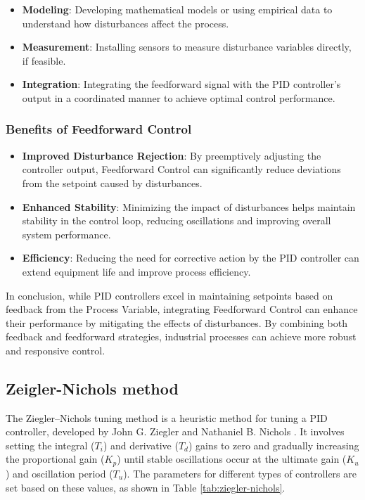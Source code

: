 \begin{itemize}
    \item \textbf{Modeling}: Developing mathematical models or using empirical data to understand how disturbances affect the process.

    \item \textbf{Measurement}: Installing sensors to measure disturbance variables directly, if feasible.

    \item \textbf{Integration}: Integrating the feedforward signal with the PID controller's output in a coordinated manner to achieve optimal control performance.
\end{itemize}

\subsubsection{Benefits of Feedforward Control}

\begin{itemize}
    \item \textbf{Improved Disturbance Rejection}: By preemptively adjusting the controller output, Feedforward Control can significantly reduce deviations from the setpoint caused by disturbances.

    \item \textbf{Enhanced Stability}: Minimizing the impact of disturbances helps maintain stability in the control loop, reducing oscillations and improving overall system performance.

    \item \textbf{Efficiency}: Reducing the need for corrective action by the PID controller can extend equipment life and improve process efficiency.
\end{itemize}

In conclusion, while PID controllers excel in maintaining setpoints based on
feedback from the Process Variable, integrating Feedforward Control can enhance
their performance by mitigating the effects of disturbances. By combining both
feedback and feedforward strategies, industrial processes can achieve more
robust and responsive control.

\subsection{Zeigler-Nichols method}
The Ziegler--Nichols tuning method is a heuristic method for tuning a PID
controller, developed by John G. Ziegler and Nathaniel B. Nichols
\cite{ziegler-nichols}. It involves setting the integral (\( T_i \)) and
derivative (\( T_d \)) gains to zero and gradually increasing the proportional
gain (\( K_p \)) until stable oscillations occur at the ultimate gain (\( K_u
\)) and oscillation period (\( T_u \)). The parameters for different types of
controllers are set based on these values, as shown in Table
\ref{tab:ziegler-nichols}.

